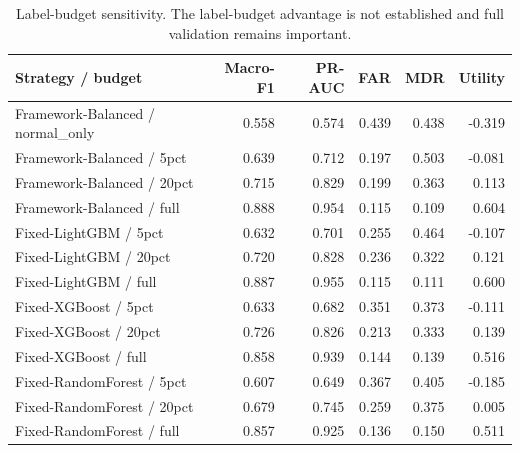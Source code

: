 \begin{table}[!htbp]
\centering
\small
\caption{Label-budget sensitivity. The label-budget advantage is not established and full validation remains important.}
\label{tab:label-budget}
\begin{tabular}{lrrrrr}
\toprule
Strategy / budget & Macro-F1 & PR-AUC & FAR & MDR & Utility \\
\midrule
Framework-Balanced / normal\_only & 0.558 & 0.574 & 0.439 & 0.438 & -0.319 \\
Framework-Balanced / 5pct & 0.639 & 0.712 & 0.197 & 0.503 & -0.081 \\
Framework-Balanced / 20pct & 0.715 & 0.829 & 0.199 & 0.363 & 0.113 \\
Framework-Balanced / full & 0.888 & 0.954 & 0.115 & 0.109 & 0.604 \\
Fixed-LightGBM / 5pct & 0.632 & 0.701 & 0.255 & 0.464 & -0.107 \\
Fixed-LightGBM / 20pct & 0.720 & 0.828 & 0.236 & 0.322 & 0.121 \\
Fixed-LightGBM / full & 0.887 & 0.955 & 0.115 & 0.111 & 0.600 \\
Fixed-XGBoost / 5pct & 0.633 & 0.682 & 0.351 & 0.373 & -0.111 \\
Fixed-XGBoost / 20pct & 0.726 & 0.826 & 0.213 & 0.333 & 0.139 \\
Fixed-XGBoost / full & 0.858 & 0.939 & 0.144 & 0.139 & 0.516 \\
Fixed-RandomForest / 5pct & 0.607 & 0.649 & 0.367 & 0.405 & -0.185 \\
Fixed-RandomForest / 20pct & 0.679 & 0.745 & 0.259 & 0.375 & 0.005 \\
Fixed-RandomForest / full & 0.857 & 0.925 & 0.136 & 0.150 & 0.511 \\
\bottomrule
\end{tabular}
\end{table}
